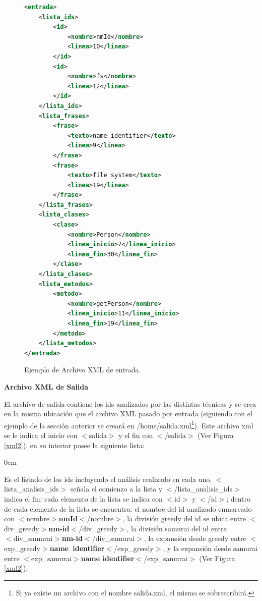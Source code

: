 \begin{appendices}
\newpage
\begin{figure}[h!] %
\begin{lstlisting}[language=xml, frame=single]
<entrada>
	<lista_ids>
		<id>
		    <nombre>nmId</nombre>
		    <linea>10</linea>
		</id>    
		<id>	    	
		    <nombre>fs</nombre>
		    <linea>12</linea>
		</id>    	    	    
	</lista_ids>
	<lista_frases>
		<frase>
			<texto>name identifier</texto>
			<linea>9</linea>
		</frase>
		<frase>
			<texto>file system</texto>
			<linea>19</linea>
		</frase>
	</lista_frases>
	<lista_clases>
		<clase>
			<nombre>Person</nombre>
			<linea_inicio>7</linea_inicio>
			<linea_fin>30</linea_fin>
		</clase>
	</lista_clases>
	<lista_metodos>
		<metodo>
			<nombre>getPerson</nombre>
			<linea_inicio>11</linea_inicio>
			<linea_fin>19</linea_fin>
		</metodo>				
	</lista_metodos>	
</entrada>

\end{lstlisting}
\caption{Ejemplo de Archivo XML de entrada.}
\label{xml1}
\end{figure}

\newpage

\noindent \textbf{Archivo XML de Salida\\}

El archivo de salida contiene los ids analizados por las distintas técnicas y se crea en la misma ubicación que el archivo XML pasado por entrada (siguiendo con el ejemplo de la sección anterior se creará en \textsf{/home/salida.xml}\footnote[1]{Si ya existe un archivo con el nombre salida.xml, el mismo se sobrescribirá.}). Este archivo xml se le indica el inicio con \mbox{$<$\textsf{salida}$>$} y el fin con \mbox{$<$/\textsf{salida}$>$} (Ver Figura \ref{xml2}), en su interior posee la siguiente lista:

\begin{description}
\itemsep0em%
\item[Lista de Identificadores Analizados:] Es el listado de los ids incluyendo el análisis realizado en cada uno, $<$\textsf{lista\_analisis\_ids}$>$ señala el comienzo a la lista y $<$/\textsf{lista\_analisis\_ids}$>$ indica el fin; cada elemento de la lista se indica con $<$\textsf{id}$>$ y $<$/\textsf{id}$>$; dentro de cada elemento de la lista se encuentra: el nombre del id analizado enmarcado con \mbox{$<$\textsf{nombre}$>$\textbf{nmId}$<$/\textsf{nombre}$>$}, la división greedy del id se ubica entre \mbox{$<$\textsf{div\_greedy}$>$\textbf{nm-id}$<$/\textsf{div\_greedy}$>$}, la división samurai del id entre\\ \mbox{$<$\textsf{div\_samurai}$>$\textbf{nm-id}$<$/\textsf{div\_samurai}$>$}, la expansión desde greedy entre \mbox{$<$\textsf{exp\_greedy}$>$\textbf{name identifier}$<$/\textsf{exp\_greedy}$>$}, y la expansión desde samurai entre $<$\textsf{exp\_samurai}$>$\textbf{name identifier}$<$/\textsf{exp\_samurai}$>$ (Ver Figura \ref{xml2}).
\end{description}


\end{appendices}

